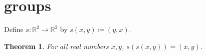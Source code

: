 \documentclass{article}
\newtheorem{theorem}{Theorem}
\begin{document}
\section{groups}
Define $s:\mathbb{R}^2\to\mathbb{R}^2$ by $s(x,y)\coloneqq(y,x)$.
\begin{theorem}\label{thm:RG02}
For all real numbers $x,y$, $s(s(x,y))=(x,y)$.
\end{theorem}
\end{document}

